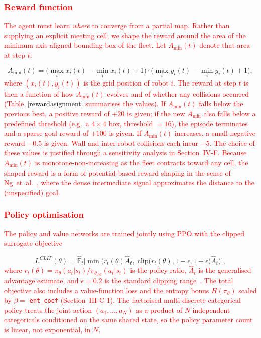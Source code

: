 \documentclass[journal]{IEEEtran}
\begin{document}
\textcolor{red}{\subsubsection{Reward function} The agent must learn \emph{where} to converge from a partial map. Rather than supplying an explicit meeting cell, we shape the reward around the area of the minimum axis-aligned bounding box of the fleet. Let $A_{\min}(t)$ denote that area at step $t$:}
\begin{equation}
\label{eq:minarea}
A_{\min}(t) = \bigl(\max_i x_i(t) - \min_i x_i(t) + 1\bigr) \cdot \bigl(\max_i y_i(t) - \min_i y_i(t) + 1\bigr),
\end{equation}
\textcolor{red}{where $(x_i(t), y_i(t))$ is the grid position of robot $i$. The reward at step $t$ is then a function of how $A_{\min}(t)$ evolves and of whether any collisions occurred (Table~\ref{rewardasignment} summarises the values). If $A_{\min}(t)$ falls below the previous best, a positive reward of $+20$ is given; if the new $A_{\min}$ also falls below a predefined threshold (e.g.\ a $4 \times 4$ box, threshold $= 16$), the episode terminates and a sparse goal reward of $+100$ is given. If $A_{\min}(t)$ increases, a small negative reward $-0.5$ is given. Wall and inter-robot collisions each incur $-5$. The choice of these values is justified through a sensitivity analysis in Section~IV-F. Because $A_{\min}(t)$ is monotone-non-increasing as the fleet contracts toward any cell, the shaped reward is a form of potential-based reward shaping in the sense of Ng~et~al.~\cite{ng1999policy}, where the dense intermediate signal approximates the distance to the (unspecified) goal.}

\textcolor{red}{\subsubsection{Policy optimisation} The policy and value networks are trained jointly using PPO with the clipped surrogate objective~\cite{schulman2017proximal}}
\begin{equation}
\label{eq:clip}
L^{CLIP}(\theta) = \hat{\mathbb{E}}_t \bigl[ \min\bigl( r_t(\theta) \hat{A}_t,\; \mathrm{clip}\bigl(r_t(\theta), 1{-}\epsilon, 1{+}\epsilon\bigr) \hat{A}_t \bigr) \bigr],
\end{equation}
\textcolor{red}{where $r_t(\theta) = \pi_\theta(a_t|s_t)/\pi_{\theta_\text{old}}(a_t|s_t)$ is the policy ratio, $\hat{A}_t$ is the generalised advantage estimate, and $\epsilon = 0.2$ is the standard clipping range~\cite{schulman2017proximal}. The total objective also includes a value-function loss and the entropy bonus $H(\pi_\theta)$ scaled by $\beta = $ \texttt{ent\_coef} (Section~III-C-1). The factorised multi-discrete categorical policy treats the joint action $(a_1, \ldots, a_N)$ as a product of $N$ independent categoricals conditioned on the same shared state, so the policy parameter count is linear, not exponential, in $N$.}
\end{document}
